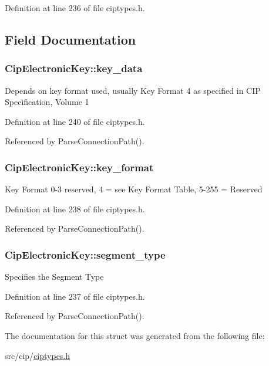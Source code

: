 \-Definition at line 236 of file ciptypes.\-h.



\subsection{\-Field \-Documentation}
\hypertarget{structCipElectronicKey_a8ff4fd3c53360adf303a1a798c4c4f3f}{
\subsubsection[{key\-\_\-data}]{ {\bf \-Cip\-Electronic\-Key\-::key\-\_\-data}}}\label{d9/da7/structCipElectronicKey_a8ff4fd3c53360adf303a1a798c4c4f3f}
\-Depends on key format used, usually \-Key \-Format 4 as specified in \-C\-I\-P \-Specification, \-Volume 1 

\-Definition at line 240 of file ciptypes.\-h.



\-Referenced by \-Parse\-Connection\-Path().

\hypertarget{structCipElectronicKey_ad82a56c49cc3fe01d397a247fedc5e8e}{
\subsubsection[{key\-\_\-format}]{ {\bf \-Cip\-Electronic\-Key\-::key\-\_\-format}}}\label{d9/da7/structCipElectronicKey_ad82a56c49cc3fe01d397a247fedc5e8e}
\-Key \-Format 0-\/3 reserved, 4 = see \-Key \-Format \-Table, 5-\/255 = \-Reserved 

\-Definition at line 238 of file ciptypes.\-h.



\-Referenced by \-Parse\-Connection\-Path().

\hypertarget{structCipElectronicKey_ab97c41c46f877d65e5e2b2aa2428b5c5}{
\subsubsection[{segment\-\_\-type}]{ {\bf \-Cip\-Electronic\-Key\-::segment\-\_\-type}}}\label{d9/da7/structCipElectronicKey_ab97c41c46f877d65e5e2b2aa2428b5c5}
\-Specifies the \-Segment \-Type 

\-Definition at line 237 of file ciptypes.\-h.



\-Referenced by \-Parse\-Connection\-Path().



\-The documentation for this struct was generated from the following file\-:\begin{DoxyCompactItemize}
\item 
src/cip/\hyperlink{ciptypes_8h}{ciptypes.\-h}\end{DoxyCompactItemize}
